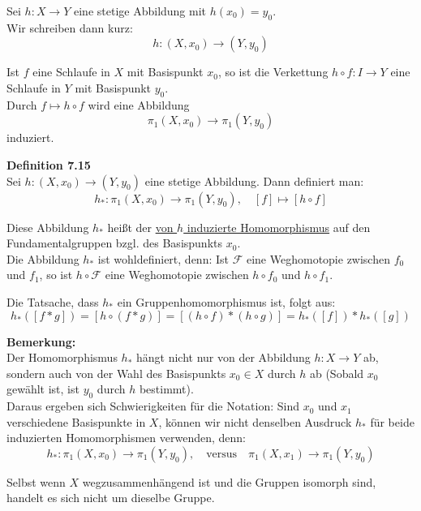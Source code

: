 \documentclass[fleqn, 12pt, letterpaper]{article}
\begin{document}
Sei \( h : X \to Y \) eine stetige Abbildung mit \( h(x_0) = y_0 \). \\
Wir schreiben dann kurz:
\[
h : (X, x_0) \to (Y, y_0)
\]

Ist \( f \) eine Schlaufe in \( X \) mit Basispunkt \( x_0 \), so ist die Verkettung \( h \circ f : I \to Y \) eine Schlaufe in \( Y \) mit Basispunkt \( y_0 \).\\

Durch \( f \mapsto h \circ f \) wird eine Abbildung
\[
\pi_1(X, x_0) \longrightarrow \pi_1(Y, y_0)
\]
induziert.

\vspace{1em}
\textbf{Definition 7.15} \\
Sei \( h : (X, x_0) \to (Y, y_0) \) eine stetige Abbildung. Dann definiert man:
\[
h_* : \pi_1(X, x_0) \to \pi_1(Y, y_0), \quad [f] \mapsto [h \circ f]
\]

Diese Abbildung \( h_* \) heißt der \underline{von \( h \) induzierte Homomorphismus} auf den Fundamentalgruppen bzgl. des Basispunkts \( x_0 \).\\

Die Abbildung \( h_* \) ist wohldefiniert, denn: Ist \( \mathcal{F} \) eine Weghomotopie zwischen \( f_0 \) und \( f_1 \), so ist \( h \circ \mathcal{F} \) eine Weghomotopie zwischen \( h \circ f_0 \) und \( h \circ f_1 \).

Die Tatsache, dass \( h_* \) ein Gruppenhomomorphismus ist, folgt aus:
\[
h_*([f * g]) = [h \circ (f * g)] = [(h \circ f) * (h \circ g)] = h_*([f]) * h_*([g])
\]

\vspace{1em}
\textbf{Bemerkung:} \\
Der Homomorphismus \( h_* \) hängt nicht nur von der Abbildung \( h : X \to Y \) ab, sondern auch von der Wahl des Basispunkts \( x_0 \in X \) durch \( h \) ab (Sobald $x_0$ gewählt ist, ist $y_0$ durch $h$ bestimmt).\\

Daraus ergeben sich Schwierigkeiten für die Notation:
Sind \( x_0 \) und \( x_1 \) verschiedene Basispunkte in \( X \), können wir nicht denselben Ausdruck \( h_* \) für beide induzierten Homomorphismen verwenden, denn:
\[
h_* : \pi_1(X, x_0) \to \pi_1(Y, y_0), \quad \text{versus} \quad \pi_1(X, x_1) \to \pi_1(Y, y_0)
\]

Selbst wenn \( X \) wegzusammenhängend ist und die Gruppen isomorph sind, handelt es sich nicht um dieselbe Gruppe.\\
\end{document}
